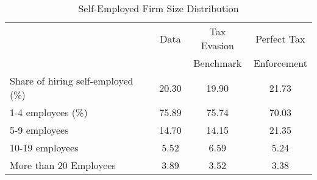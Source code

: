 \documentclass[a4paper,10pt]{article}
\begin{document}
 
\begin{table}[tbp] 
\caption{Self-Employed Firm Size Distribution \label{tab:firm_size_employees}} 
\begin{center} 
\begin{tabular}{lccc} 
\hline 
                  & Data  & Tax Evasion & Perfect Tax  \\ 
                  &       & Benchmark   & Enforcement  \\ 
\hline 
\hline 
Share of hiring self-employed (\%) &    20.30 &    19.90 &    21.73  \\ 
\hline 
1-4 employees (\%)    &    75.89 &    75.74 &    70.03  \\ 
5-9 employees           &    14.70 &    14.15 &    21.35  \\ 
10-19 employees         &     5.52 &     6.59 &     5.24  \\ 
More than 20 Employees  &     3.89 &     3.52 &     3.38  \\ 
\hline 
\end{tabular} 
\end{center} 
\end{table} 
\end{document}
